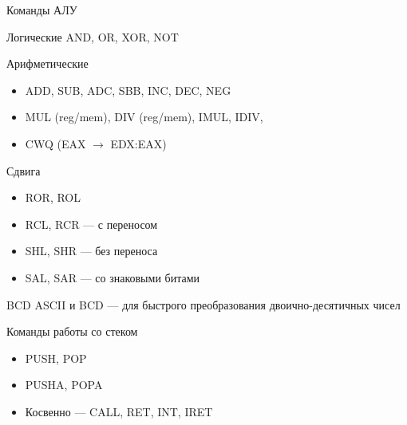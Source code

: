 \documentclass[xetex,aspectratio=43]{beamer}
\begin{document}
\begin{frame}{Команды АЛУ}
    \begin{block}{Логические}
        AND, OR, XOR, NOT
    \end{block}

    \begin{block}{Арифметические}
        \begin{itemize}
            \item
            ADD, SUB, ADC, SBB, INC, DEC, NEG
            \item
            MUL (reg/mem), DIV (reg/mem), IMUL, IDIV,
            \item
            CWQ (EAX \(\rightarrow\) EDX:EAX)
        \end{itemize}
    \end{block}

    \begin{block}{Сдвига}
        \begin{itemize}
            \item
            ROR, ROL
            \item
            RCL, RCR --- с переносом
            \item
            SHL, SHR --- без переноса
            \item
            SAL, SAR --- со знаковыми битами
        \end{itemize}
    \end{block}
\end{frame}

\begin{frame}{BCD}
    ASCII и BCD --- для быстрого преобразования двоично-десятичных чисел
\end{frame}

\begin{frame}{Команды работы со стеком}
    \begin{itemize}
        \item
        PUSH, POP
        \item
        PUSHA, POPA
        \item
        Косвенно --- CALL, RET, INT, IRET
    \end{itemize}
\end{frame}
\end{document}
